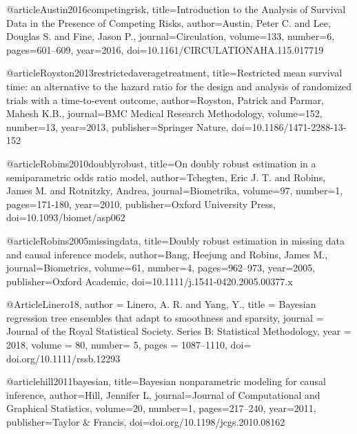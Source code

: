 @article{Austin2016competingrisk,
  title={Introduction to the Analysis of Survival Data in the Presence of Competing Risks},
  author={Austin, Peter C. and Lee, Douglas S. and Fine, Jason P.},
  journal={Circulation},
  volume={133},
  number={6},
  pages={601--609},
  year={2016},
  doi={10.1161/CIRCULATIONAHA.115.017719}
}





@article{Royston2013restrictedaveragetreatment,
  title={Restricted mean survival time: an alternative to the hazard ratio for the design and analysis of randomized trials with a time-to-event outcome},
  author={Royston, Patrick and Parmar, Mahesh K.B.},
  journal={BMC Medical Research Methodology},
  volume={152},
  number={13},
  year={2013},
  publisher={Springer Nature},
  doi={10.1186/1471-2288-13-152}
}





@article{Robins2010doublyrobust,
  title={On doubly robust estimation in a semiparametric odds ratio model},
  author={Tchegten, Eric J. T. and Robins, James M. and Rotnitzky, Andrea},
  journal={Biometrika},
  volume={97},
  number={1},
  pages={171-180},
  year={2010},
  publisher={Oxford University Press},
  doi={10.1093/biomet/asp062}
}






@article{Robins2005missingdata,
  title={Doubly robust estimation in missing data and causal inference models},
  author={Bang, Heejung and Robins, James M.},
  journal={Biometrics},
  volume={61},
  number={4},
  pages={962--973},
  year={2005},
  publisher={Oxford Academic},
  doi={10.1111/j.1541-0420.2005.00377.x}
}














@Article{Linero18,
   author = {Linero, A. R. and Yang, Y.},
   title = {Bayesian regression tree ensembles that adapt to smoothness and sparsity},
   journal = {Journal of the Royal Statistical Society. Series B: Statistical Methodology},
   year = {2018},
   volume = {80},
   number= {5},
   pages = {1087--1110},
   doi= {doi.org/10.1111/rssb.12293}
 }






@article{hill2011bayesian,
  title={Bayesian nonparametric modeling for causal inference},
  author={Hill, Jennifer L},
  journal={Journal of Computational and Graphical Statistics},
  volume={20},
  number={1},
  pages={217--240},
  year={2011},
  publisher={Taylor \& Francis},
  doi={doi.org/10.1198/jcgs.2010.08162}
}







